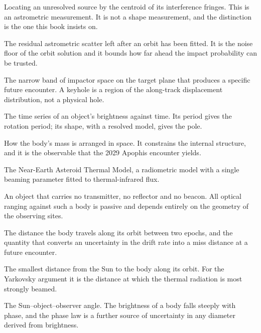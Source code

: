\begin{description}[style=nextline,leftmargin=1.1em,labelindent=0pt,
  font=\normalfont\ttfamily\color{accent},itemsep=3pt,parsep=0pt]
\item[Interferometric centroiding] Locating an unresolved source by the
centroid of its interference fringes. This is an astrometric measurement.
It is not a shape measurement, and the distinction is the one this book
insists on.

\item[Jitter] The residual astrometric scatter left after an orbit has been
fitted. It is the noise floor of the orbit solution and it bounds how far
ahead the impact probability can be trusted.

\item[Keyhole] The narrow band of impactor space on the target plane that
produces a specific future encounter. A keyhole is a region of the along-track
displacement distribution, not a physical hole.

\item[Lightcurve] The time series of an object's brightness against time. Its
period gives the rotation period; its shape, with a resolved model, gives the
pole.

\item[Mass distribution] How the body's mass is arranged in space. It
constrains the internal structure, and it is the observable that the 2029
Apophis encounter yields.

\item[NEATM] The Near-Earth Asteroid Thermal Model, a radiometric model with
a single beaming parameter fitted to thermal-infrared flux.

\item[Non-cooperative target] An object that carries no transmitter, no
reflector and no beacon. All optical ranging against such a body is passive
and depends entirely on the geometry of the observing sites.

\item[Along-track displacement] The distance the body travels along its
orbit between two epochs, and the quantity that converts an uncertainty in
the drift rate into a miss distance at a future encounter.

\item[Perihelion distance \(q\)] The smallest distance from the Sun to the
body along its orbit. For the Yarkovsky argument it is the distance at which
the thermal radiation is most strongly beamed.

\item[Phase angle] The Sun--object--observer angle. The brightness of a body
falls steeply with phase, and the phase law is a further source of
uncertainty in any diameter derived from brightness.


\end{description}
